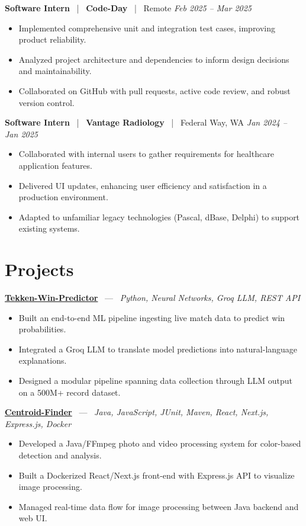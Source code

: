 \documentclass[10pt, letterpaper]{article}
\newcommand{\jobhead}[4]{%
  \vspace{5pt}%
  {\bfseries\color{dark}#1}%
  ~{\color{light}|}~%
  {\bfseries\color{navy}#2}%
  ~{\color{light}|}~%
  {\color{light}#3}%
  \hfill{\color{light}\small\textit{#4}}\\[-2pt]%
}
\newcommand{\projhead}[3]{%
  \vspace{5pt}%
  {\bfseries\color{dark}\href{#2}{#1}}%
  ~{\color{light}---}~%
  {\color{light}\small\textit{#3}}\\[-2pt]%
}
\begin{document}
\jobhead{Software Intern}{Code-Day}{Remote}{Feb 2025 – Mar 2025}
\begin{itemize}
  \item Implemented comprehensive unit and integration test cases, improving product reliability.
  \item Analyzed project architecture and dependencies to inform design decisions and maintainability.
  \item Collaborated on GitHub with pull requests, active code review, and robust version control.
\end{itemize}

\jobhead{Software Intern}{Vantage Radiology}{Federal Way, WA}{Jan 2024 – Jan 2025}
\begin{itemize}
  \item Collaborated with internal users to gather requirements for healthcare application features.
  \item Delivered UI updates, enhancing user efficiency and satisfaction in a production environment.
  \item Adapted to unfamiliar legacy technologies (Pascal, dBase, Delphi) to support existing systems.
\end{itemize}

\section{Projects}

\projhead{Tekken-Win-Predictor}{}{Python, Neural Networks, Groq LLM, REST API}
\begin{itemize}
  \item Built an end-to-end ML pipeline ingesting live match data to predict win probabilities.
  \item Integrated a Groq LLM to translate model predictions into natural-language explanations.
  \item Designed a modular pipeline spanning data collection through LLM output on a 500M+ record dataset.
\end{itemize}

\projhead{Centroid-Finder}{https://github.com/xavierb117/centroid-finder}{Java, JavaScript, JUnit, Maven, React, Next.js, Express.js, Docker}
\begin{itemize}
  \item Developed a Java/FFmpeg photo and video processing system for color-based detection and analysis.
  \item Built a Dockerized React/Next.js front-end with Express.js API to visualize image processing.
  \item Managed real-time data flow for image processing between Java backend and web UI.
\end{itemize}
\end{document}
